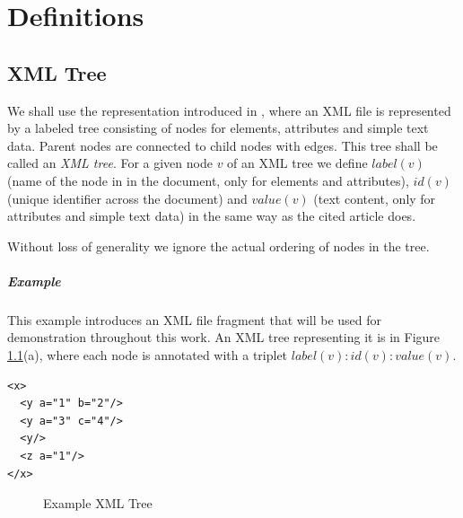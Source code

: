 \chapter{Definitions}
\label{chapter-definitions}

\section{XML Tree}

We shall use the representation introduced in \cite{fidax}, where an XML file is represented by a labeled tree consisting of nodes for elements, attributes and simple text data. Parent nodes are connected to child nodes with edges. This tree shall be called an \textit{XML tree}. For a given node $v$ of an XML tree we define $label(v)$ (name of the node in in the document, only for elements and attributes), $id(v)$ (unique identifier across the document) and $value(v)$ (text content, only for attributes and simple text data) in the same way as the cited article does.

Without loss of generality we ignore the actual ordering of nodes in the tree.

\paragraph{Example}

This example introduces an XML file fragment that will be used for demonstration throughout this work. An XML tree representing it is in Figure \ref{image-definitions-example-xml-tree}(a), where each node is annotated with a triplet $label(v) : id(v) : value(v)$.

\begin{verbatim}
<x>
  <y a="1" b="2"/>
  <y a="3" c="4"/>
  <y/>
  <z a="1"/>
</x>
\end{verbatim}

\begin{figure}
  \caption{Example XML Tree}
  \label{image-definitions-example-xml-tree} 
  \centering
\end{figure}

